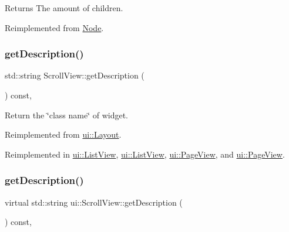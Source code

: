 \begin{DoxyReturn}{Returns}
The amount of children. 
\end{DoxyReturn}


Reimplemented from \hyperlink{classNode_abe0559adacadcb3a367c8cf7ba65730e}{Node}.

\mbox{\label{classui_1_1ScrollView_a3a808390a8d9162dbbf83d5211e87f2e}} 
\subsubsection{\texorpdfstring{get\+Description()}{getDescription()}\hspace{0.1cm}{\footnotesize\ttfamily [1/2]}}
{\footnotesize\ttfamily std\+::string Scroll\+View\+::get\+Description (\begin{DoxyParamCaption}{ }\end{DoxyParamCaption}) const\hspace{0.3cm}{\ttfamily [override]}, {\ttfamily [virtual]}}

Return the \char`\"{}class name\char`\"{} of widget. 

Reimplemented from \hyperlink{classui_1_1Layout_a3fdf14a50462dff31ec875b28e223c7f}{ui\+::\+Layout}.



Reimplemented in \hyperlink{classui_1_1ListView_a921a755d9787f976af9424ceb16a1aa3}{ui\+::\+List\+View}, \hyperlink{classui_1_1ListView_a653bb454095ef227949f7c791b68180c}{ui\+::\+List\+View}, \hyperlink{classui_1_1PageView_aead0575c0e5d24da3731501afadf81e9}{ui\+::\+Page\+View}, and \hyperlink{classui_1_1PageView_a3c9b2934fdbbb44e2c456feee27b53de}{ui\+::\+Page\+View}.

\mbox{\label{classui_1_1ScrollView_ac13041fae03618740ee778f8c3c6db7e}} 
\subsubsection{\texorpdfstring{get\+Description()}{getDescription()}\hspace{0.1cm}{\footnotesize\ttfamily [2/2]}}
{\footnotesize\ttfamily virtual std\+::string ui\+::\+Scroll\+View\+::get\+Description (\begin{DoxyParamCaption}{ }\end{DoxyParamCaption}) const\hspace{0.3cm}{\ttfamily [override]}, {\ttfamily [virtual]}}

